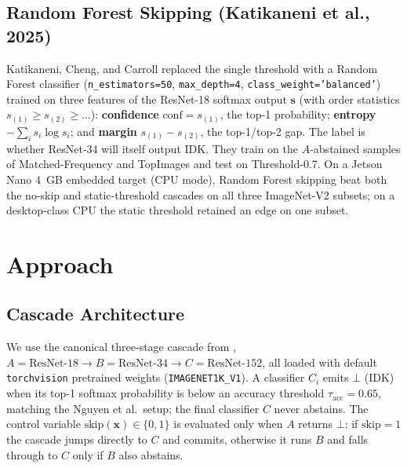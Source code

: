 \documentclass[conference]{IEEEtran}
\begin{document}
\subsection{Random Forest Skipping (Katikaneni et al., 2025)}
Katikaneni, Cheng, and Carroll \cite{katikaneni2025randomforest} replaced the single threshold with a Random Forest classifier (\texttt{n\_estimators=50}, \texttt{max\_depth=4}, \texttt{class\_weight='balanced'}) trained on three features of the ResNet-18 softmax output $\mathbf{s}$ (with order statistics $s_{(1)} \ge s_{(2)} \ge \dots$): \textbf{confidence} $\mathrm{conf} = s_{(1)}$, the top-1 probability; \textbf{entropy} $-\sum_i s_i \log s_i$; and \textbf{margin} $s_{(1)} - s_{(2)}$, the top-1/top-2 gap.
The label is whether ResNet-34 will itself output IDK. They train on the $A$-abstained samples of Matched-Frequency and TopImages and test on Threshold-0.7. On a Jetson Nano 4~GB embedded target (CPU mode), Random Forest skipping beat both the no-skip and static-threshold cascades on all three ImageNet-V2 subsets; on a desktop-class CPU the static threshold retained an edge on one subset.

\section{Approach}
\label{sec:approach}

\subsection{Cascade Architecture}
We use the canonical three-stage cascade from \cite{nguyen2024probabilistic, katikaneni2025randomforest}, $A = \text{ResNet-18} \to B = \text{ResNet-34} \to C = \text{ResNet-152}$, all loaded with default \texttt{torchvision} pretrained weights (\texttt{IMAGENET1K\_V1}). A classifier $C_i$ emits $\bot$ (IDK) when its top-1 softmax probability is below an accuracy threshold $\tau_{\text{acc}} = 0.65$, matching the Nguyen et al.\ setup; the final classifier $C$ never abstains. The control variable $\mathrm{skip}(\mathbf{x}) \in \{0, 1\}$ is evaluated only when $A$ returns $\bot$: if $\mathrm{skip}=1$ the cascade jumps directly to $C$ and commits, otherwise it runs $B$ and falls through to $C$ only if $B$ also abstains.
\end{document}
